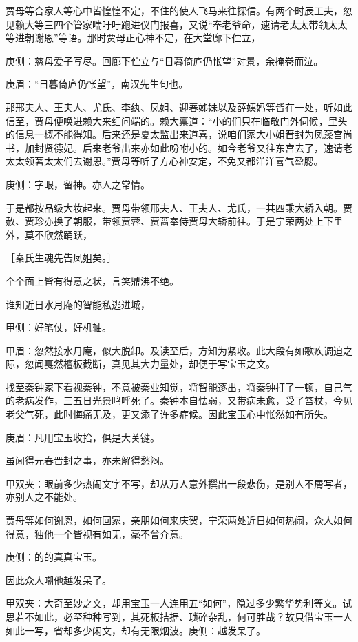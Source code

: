 \begin{parag}
    贾母等合家人等心中皆惶惶不定，不住的使人飞马来往探信。有两个时辰工夫，忽见赖大等三四个管家喘吁吁跑进仪门报喜，又说“奉老爷命，速请老太太带领太太等进朝谢恩”等语。那时贾母正心神不定，在大堂廊下伫立，\begin{note}庚侧：慈母爱子写尽。回廊下伫立与“日暮倚庐仍怅望”对景，余掩卷而泣。\end{note}\begin{note}庚眉：“日暮倚庐仍怅望”，南汉先生句也。\end{note}那邢夫人、王夫人、尤氏、李纨、凤姐、迎春姊妹以及薛姨妈等皆在一处，听如此信至，贾母便唤进赖大来细问端的。赖大禀道：“小的们只在临敬门外伺候，里头的信息一概不能得知。后来还是夏太监出来道喜，说咱们家大小姐晋封为凤藻宫尚书，加封贤德妃。后来老爷出来亦如此吩咐小的。如今老爷又往东宫去了，速请老太太领著太太们去谢恩。”贾母等听了方心神安定，不免又都洋洋喜气盈腮。\begin{note}庚侧：字眼，留神。亦人之常情。\end{note}于是都按品级大妆起来。贾母带领邢夫人、王夫人、尤氏，一共四乘大轿入朝。贾赦、贾珍亦换了朝服，带领贾蓉、贾蔷奉侍贾母大轿前往。于是宁荣两处上下里外，莫不欣然踊跃，\begin{note}［秦氏生魂先告凤姐矣。］\end{note}个个面上皆有得意之状，言笑鼎沸不绝。
\end{parag}


\begin{parag}
    谁知近日水月庵的智能私逃进城，\begin{note}甲侧：好笔仗，好机轴。\end{note}\begin{note}甲眉：忽然接水月庵，似大脱卸。及读至后，方知为紧收。此大段有如歌疾调迫之际，忽闻戛然檀板截断，真见其大力量处，却便于写宝玉之文。\end{note}找至秦钟家下看视秦钟，不意被秦业知觉，将智能逐出，将秦钟打了一顿，自己气的老病发作，三五日光景鸣呼死了。秦钟本自怯弱，又带病未愈，受了笞杖，今见老父气死，此时悔痛无及，更又添了许多症候。因此宝玉心中怅然如有所失。\begin{note}庚眉：凡用宝玉收拾，俱是大关键。\end{note}虽闻得元春晋封之事，亦未解得愁闷。\begin{note}甲双夹：眼前多少热闹文字不写，却从万人意外撰出一段悲伤，是别人不屑写者，亦别人之不能处。\end{note}贾母等如何谢恩，如何回家，亲朋如何来庆贺，宁荣两处近日如何热闹，众人如何得意，独他一个皆视有如无，毫不曾介意。\begin{note}庚侧：的的真真宝玉。\end{note}因此众人嘲他越发呆了。\begin{note}甲双夹：大奇至妙之文，却用宝玉一人连用五“如何”，隐过多少繁华势利等文。试思若不如此，必至种种写到，其死板拮据、琐碎杂乱，何可胜哉？故只借宝玉一人如此一写，省却多少闲文，却有无限烟波。庚侧：越发呆了。\end{note}
\end{parag}



